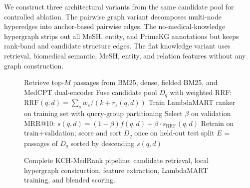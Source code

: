 We construct three architectural variants from the same candidate pool for controlled ablation. The pairwise graph variant decomposes multi-node hyperedges into anchor-based pairwise edges. The no-medical-knowledge hypergraph strips out all MeSH, entity, and PrimeKG annotations but keeps rank-band and candidate structure edges. The flat knowledge variant uses retrieval, biomedical semantic, MeSH, entity, and relation features without any graph construction.

\begin{figure}[htbp]
\centering
\begin{minipage}{0.98\textwidth}
\begin{algorithm}[H]
\SetAlgoLined
\caption{KCH-MedRank Knowledge-Constrained Evidence Reranking}
\label{alg:kch-medrank}
Retrieve top-$M$ passages from BM25, dense, fielded BM25, and MedCPT dual-encoder\;
Fuse candidate pool $D_q$ with weighted RRF: $\mathrm{RRF}(q,d) = \sum_s w_s/(k+r_s(q,d))$\;
\BlankLine
{}
\BlankLine
{}
\BlankLine
Train LambdaMART ranker on training set with query-group partitioning\;
Select $\beta$ on validation MRR@10: $s(q,d) = (1-\beta)f(q,d) + \beta \cdot s_{\text{RRF}}(q,d)$\;
Retrain on train+validation; score and sort $D_q$ once on held-out test split\;
\Return $E$ = passages of $D_q$ sorted by descending $s(q,d)$\;
\end{algorithm}
\end{minipage}
\caption{Complete KCH-MedRank pipeline: candidate retrieval, local hypergraph construction, feature extraction, LambdaMART training, and blended scoring.}
\label{fig:kch-algorithm}
\end{figure}

